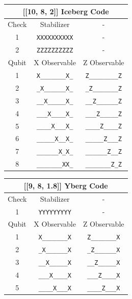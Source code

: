 \documentclass[onecolumn,unpublished,a4paper]{quantumarticle}
\theoremstyle{definition}
\theoremstyle{definition}
\theoremstyle{definition}
\begin{document}
\begin{table}[h]
    \centering
    \begin{tabular}{|c|c|c|}
        \hline
        \multicolumn{3}{|c|}{[[10, 8, 2]] Iceberg Code} \\
        \hline
        Check & Stabilizer & - \\
        \hline
        1 & \texttt{XXXXXXXXXX} & - \\
        2 & \texttt{ZZZZZZZZZZ} & - \\
        \hline
        Qubit & X Observable & Z Observable \\
        \hline
        1 & \texttt{X\_\_\_\_\_\_\_X\_} & \texttt{Z\_\_\_\_\_\_\_\_Z} \\
        2 & \texttt{\_X\_\_\_\_\_\_X\_} & \texttt{\_Z\_\_\_\_\_\_\_Z} \\
        3 & \texttt{\_\_X\_\_\_\_\_X\_} & \texttt{\_\_Z\_\_\_\_\_\_Z} \\
        4 & \texttt{\_\_\_X\_\_\_\_X\_} & \texttt{\_\_\_Z\_\_\_\_\_Z} \\
        5 & \texttt{\_\_\_\_X\_\_\_X\_} & \texttt{\_\_\_\_Z\_\_\_\_Z} \\
        6 & \texttt{\_\_\_\_\_X\_\_X\_} & \texttt{\_\_\_\_\_Z\_\_\_Z} \\
        7 & \texttt{\_\_\_\_\_\_X\_X\_} & \texttt{\_\_\_\_\_\_Z\_\_Z} \\
        8 & \texttt{\_\_\_\_\_\_\_XX\_} & \texttt{\_\_\_\_\_\_\_Z\_Z} \\
        \hline
    \end{tabular}
    \hfill
    \begin{tabular}{|c|c|c|}
        \hline
        \multicolumn{3}{|c|}{[[9, 8, 1.8]] Yberg Code} \\
        \hline
        Check & Stabilizer & - \\
        \hline
        1 & \texttt{YYYYYYYYY} & - \\
        \hline
        Qubit & X Observable & Z Observable \\
        \hline
        1 & \texttt{X\_\_\_\_\_\_\_X} & \texttt{Z\_\_\_\_\_\_\_X} \\
        2 & \texttt{\_X\_\_\_\_\_\_X} & \texttt{\_Z\_\_\_\_\_\_X} \\
        3 & \texttt{\_\_X\_\_\_\_\_X} & \texttt{\_\_Z\_\_\_\_\_X} \\
        4 & \texttt{\_\_\_X\_\_\_\_X} & \texttt{\_\_\_Z\_\_\_\_X} \\
        5 & \texttt{\_\_\_\_X\_\_\_X} & \texttt{\_\_\_\_Z\_\_\_X} \\

\end{tabular}
\end{table}
\end{document}
